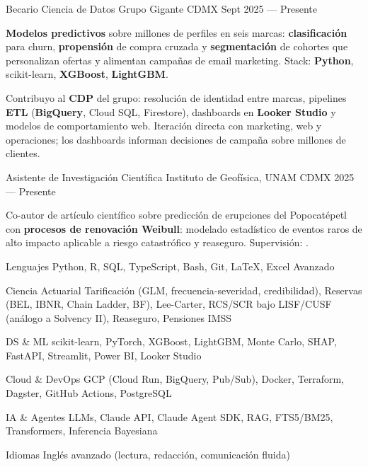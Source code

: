 \documentclass[10pt, letterpaper]{awesome-cv}
\begin{document}
\begin{cventries}

  \cventry
    {Becario Ciencia de Datos}
    {Grupo Gigante}
    {CDMX}
    {Sept 2025 — Presente}
    {
      \begin{cvitems}
        \item {\textbf{Modelos predictivos} sobre millones de perfiles en seis marcas: \textbf{clasificación} para churn, \textbf{propensión} de compra cruzada y \textbf{segmentación} de cohortes que personalizan ofertas y alimentan campañas de email marketing. Stack: \textbf{Python}, scikit-learn, \textbf{XGBoost}, \textbf{LightGBM}.}
        \item {Contribuyo al \textbf{CDP} del grupo: resolución de identidad entre marcas, pipelines \textbf{ETL} (\textbf{BigQuery}, Cloud SQL, Firestore), dashboards en \textbf{Looker Studio} y modelos de comportamiento web. Iteración directa con marketing, web y operaciones; los dashboards informan decisiones de campaña sobre millones de clientes.}
      \end{cvitems}
    }

  \cventry
    {Asistente de Investigación Científica }
    {Instituto de Geofísica, UNAM}
    {CDMX}
    {2025 — Presente}
    {
      \begin{cvitems}
        \item {Co-autor de artículo científico sobre predicción de erupciones del Popocatépetl con \textbf{procesos de renovación Weibull}: modelado estadístico de eventos raros de alto impacto aplicable a riesgo catastrófico y reaseguro. Supervisión: .}
      \end{cvitems}
    }

\end{cventries}


\begin{cvskills}
  \cvskill
    {Lenguajes}
    {Python, R, SQL, TypeScript, Bash, Git, \LaTeX, Excel Avanzado}

  \cvskill
    {Ciencia Actuarial}
    {Tarificación (GLM, frecuencia-severidad, credibilidad), Reservas (BEL, IBNR, Chain Ladder, BF), Lee-Carter, RCS/SCR bajo LISF/CUSF (análogo a Solvency II), Reaseguro, Pensiones IMSS}

  \cvskill
    {DS \& ML}
    {scikit-learn, PyTorch, XGBoost, LightGBM, Monte Carlo, SHAP, FastAPI, Streamlit, Power BI, Looker Studio}

  \cvskill
    {Cloud \& DevOps}
    {GCP (Cloud Run, BigQuery, Pub/Sub), Docker, Terraform, Dagster, GitHub Actions, PostgreSQL}

  \cvskill
    {IA \& Agentes}
    {LLMs, Claude API, Claude Agent SDK, RAG, FTS5/BM25, Transformers, Inferencia Bayesiana}

  \cvskill
    {Idiomas}
    {Inglés avanzado (lectura, redacción, comunicación fluida)}
\end{cvskills}
\end{document}
